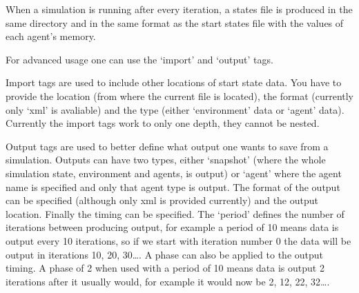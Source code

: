 When a simulation is running after every iteration, a states file is produced
in the same directory and in the same format as the start states file with the
values of each agent's memory.

For advanced usage one can use the `import' and `output' tags.

Import tags are used to include other locations of start state data. You have 
to provide the location (from where the current file is located), the format 
(currently only `xml' is avaliable) and the type (either `environment' data 
or `agent' data). Currently the import tags work to only one depth, they 
cannot be nested.

Output tags are used to better define what output one wants to save from a 
simulation. Outputs can have two types, either `snapshot' (where the whole 
simulation state, environment and agents, is output) or `agent' where the 
agent name is specified and only that agent type is output. The format of the 
output can be specified (although only xml is provided currently) and the 
output location. Finally the timing can be specified. The `period' defines 
the number of iterations between producing output, for example a period of 10 
means data is output every 10 iterations, so if we start with iteration number 
0 the data will be output in iterations 10, 20, 30\ldots. A phase can also be
applied to the output timing. A phase of 2 when used with a period of 10 means
data is output 2 iterations after it usually would, for example it would now be
2, 12, 22, 32\ldots. 
